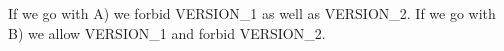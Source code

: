 If we go with A) we forbid VERSION\_1 as well as VERSION\_2. If we go with B) we allow  VERSION\_1 and forbid VERSION\_2.
